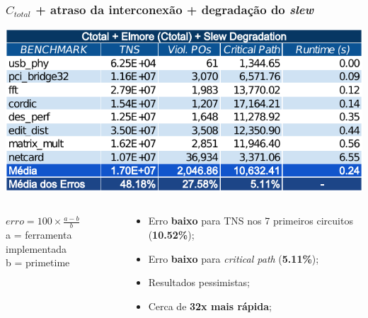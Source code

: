 \documentclass[10pt,a4paper]{beamer}
\begin{document}
		\begin{frame}[t]
			\frametitle{$C_{total}$ + atraso da interconexão + degradação do \textit{slew}}
			\vspace{-.5cm}
			\begin{center}
				\includegraphics[width=\linewidth]{img/lump_elmore_slew.pdf}
			\end{center}
			\begin{columns}
				\begin{column}{0.4\textwidth}
					\begin{shaded}
						$erro = 100 \times \frac{a - b}{ b } $ \\
						\small{a = ferramenta implementada} \\
						\small{b = primetime}
					\end{shaded}
				\end{column}
				\begin{column}{0.6\textwidth}
					\begin{small}
					
						\begin{itemize}
							\item Erro \textbf{baixo} para TNS nos 7 primeiros circuitos (\textbf{10.52\%});
							\item Erro \textbf{baixo} para \textit{critical path} (\textbf{5.11\%});
							\item Resultados pessimistas;
							\item Cerca de \textbf{32x mais rápida};
						\end{itemize}
					\end{small}
				\end{column}
			\end{columns}			
			
		\end{frame}
		
		
		
\end{document}
